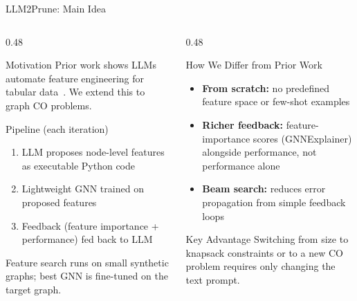 \documentclass[aspectratio=169,xcolor=dvipsnames,8pt]{beamer}
\begin{document}
\begin{frame}{LLM2Prune: Main Idea}
  \begin{columns}[T]
    \begin{column}{0.48\textwidth}
      \begin{block}{Motivation}
        Prior work shows LLMs automate feature engineering for tabular
        data~\cite{zhang2023openfe,han2024large,hollmann2023large}.
        We extend this to graph CO problems.
      \end{block}

      \vspace{0.2cm}

      \begin{block}{Pipeline (each iteration)}
        \begin{enumerate}
          \item LLM proposes node-level features as executable Python code
          \item Lightweight GNN trained on proposed features
          \item Feedback (feature importance + performance) fed back to LLM
        \end{enumerate}
        Feature search runs on small synthetic graphs; best GNN is fine-tuned
        on the target graph.
      \end{block}
    \end{column}
    \begin{column}{0.48\textwidth}
      \begin{block}{How We Differ from Prior Work}
        \begin{itemize}
          \item \textbf{From scratch:} no predefined feature space or few-shot examples
          \item \textbf{Richer feedback:} feature-importance scores (GNNExplainer)
            alongside performance, not performance alone
          \item \textbf{Beam search:} reduces error propagation from simple feedback loops
        \end{itemize}
      \end{block}

      \vspace{0.2cm}

      \begin{exampleblock}{Key Advantage}
        Switching from size to knapsack constraints or to a new CO problem
        requires only changing the text prompt.
      \end{exampleblock}
    \end{column}
  \end{columns}
\end{frame}
\end{document}
